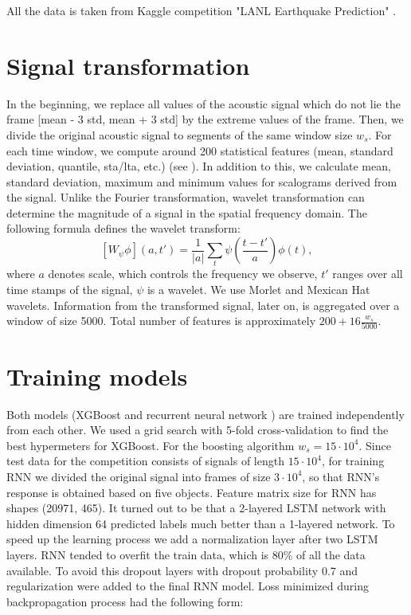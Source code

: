 \documentclass[12pt, a4paper]{article}
\begin{document}
All the data is taken from Kaggle competition "LANL Earthquake Prediction" \cite{Competition}.

\section{Signal transformation}

 In the beginning, we replace all values of the acoustic signal which do not lie the frame [mean - 3 std, mean + 3 std] by the extreme values of the frame. Then, we divide the original acoustic signal to segments of the same window size $w_s$. For each time window, we compute around 200 statistical features (mean, standard deviation, quantile, sta/lta, etc.) (see \cite{Kernel}). In addition to this, we calculate mean, standard deviation, maximum and minimum values for scalograms derived from the signal. Unlike the Fourier transformation, wavelet transformation \cite{wavelet} can determine the magnitude of a signal in the spatial frequency domain. The following formula defines the wavelet transform:
$$
[W_{\psi} \phi] (a, t') = \frac{1}{|a|} \sum_t \psi\left(\frac{t - t'}{a}\right) \phi(t),
$$
where $a$ denotes scale, which controls the frequency we observe, $t'$ ranges over all time stamps of the signal, $\psi$ is a wavelet. 
We use Morlet and Mexican Hat wavelets. Information from the transformed signal, later on, is aggregated over a window of size 5000. Total number of features is approximately $200 + 16 \frac{w_s}{5000}$. 

\section{Training models}

Both models (XGBoost \cite{xgboost} and recurrent neural network \cite{lstm}) are trained independently from each other. We used a grid search with 5-fold cross-validation to find the best hypermeters for XGBoost. For the boosting algorithm $w_s = 15 \cdot 10^4$. Since test data for the competition \cite{Competition} consists of signals of length $15 \cdot 10^4$, for training RNN we divided the original signal into frames of size $3 \cdot 10^4$, so that RNN's response is obtained based on five objects. Feature matrix size for RNN has shapes (20971, 465). It turned out to be that a 2-layered LSTM network with hidden dimension 64 predicted labels much better than a 1-layered network. To speed up the learning process we add a normalization layer after two LSTM layers. RNN tended to overfit the train data, which is 80\% of all the data available. To avoid this dropout layers with dropout probability 0.7 and regularization were added to the final RNN model.  Loss minimized during backpropagation process had the following form:
\end{document}
